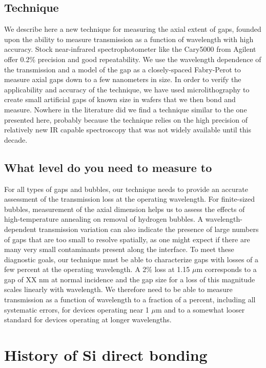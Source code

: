 \documentclass[osajnl,preprint,showpacs,superscriptaddress,12pt]{revtex4-1} %
\begin{document}
\subsection{Technique}
We describe here a new technique for measuring the axial extent of gaps, founded upon the ability to measure transmission as a function of wavelength with high accuracy.   Stock near-infrared spectrophotometer like the Cary5000 from Agilent offer 0.2\% precision and good repeatability.  We use the wavelength dependence of the transmission and a model of the gap as a closely-spaced Fabry-Perot to measure axial gaps down to a few nanometers in size.  In order to verify the applicability and accuracy of the technique, we have used microlithography to create small artificial gaps of known size in wafers that we then bond and measure.  Nowhere in the literature did we find a technique similar to the one presented here, probably because the technique relies on the high precision of relatively new IR capable spectroscopy that was not widely available until this decade.

\subsection{What level do you need to measure to}
For all types of gaps and bubbles, our technique needs to provide an accurate assessment of the transmission loss at the operating wavelength.  For finite-sized bubbles, measurement of the axial dimension helps us to assess the effects of high-temperature annealing on removal of hydrogen bubbles.  A wavelength-dependent transmission variation can also indicate the presence of large numbers of gaps that are too small to resolve spatially, as one might expect if there are many very small contaminants present along the interface.  To meet these diagnostic goals, our technique must be able to characterize gaps with losses of a few percent at the operating wavelength.  A 2\% loss at 1.15 $\mu$m corresponds to a gap of XX nm at normal incidence and the gap size for a loss of this magnitude scales linearly with wavelength.  We therefore need to be able to measure transmission as a function of wavelength to a fraction of a percent, including all systematic errors, for devices operating near 1 $\mu$m and to a somewhat looser standard for devices operating at longer wavelengths. 

\section{History of Si direct bonding}
\label{secHistory}
\end{document}

